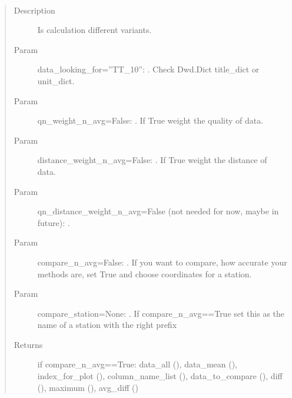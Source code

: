 \documentclass[letterpaper,10pt,english]{sphinxmanual}
\begin{document}
\begin{fulllineitems}
\begin{fulllineitems}
\label{\detokenize{DwdNearNeighbor:DwdNearNeighbor.NearNeighbor.average_for_coordinate}}~\begin{quote}\begin{description}
\item[{Description}] \leavevmode
\sphinxAtStartPar
Is calculation different variants.

\item[{Param}] \leavevmode
\sphinxAtStartPar
data\_looking\_for=”TT\_10”: . Check Dwd.Dict title\_dict or unit\_dict.

\item[{Param}] \leavevmode
\sphinxAtStartPar
qn\_weight\_n\_avg=False: . If True weight the quality of data.

\item[{Param}] \leavevmode
\sphinxAtStartPar
distance\_weight\_n\_avg=False: . If True weight the distance of data.

\item[{Param}] \leavevmode
\sphinxAtStartPar
qn\_distance\_weight\_n\_avg=False (not needed for now, maybe in future): .

\item[{Param}] \leavevmode
\sphinxAtStartPar
compare\_n\_avg=False: . If you want to compare, how accurate your methods are, set True and choose coordinates for a station.

\item[{Param}] \leavevmode
\sphinxAtStartPar
compare\_station=None: . If compare\_n\_avg==True set this as the name of a station with the right prefix

\item[{Returns}] \leavevmode
\sphinxAtStartPar
if compare\_n\_avg==True: data\_all (), data\_mean (), index\_for\_plot (), column\_name\_list (), data\_to\_compare (), diff (), maximum (), avg\_diff ()


\end{description}
\end{quote}
\end{fulllineitems}
\end{fulllineitems}
\end{document}
